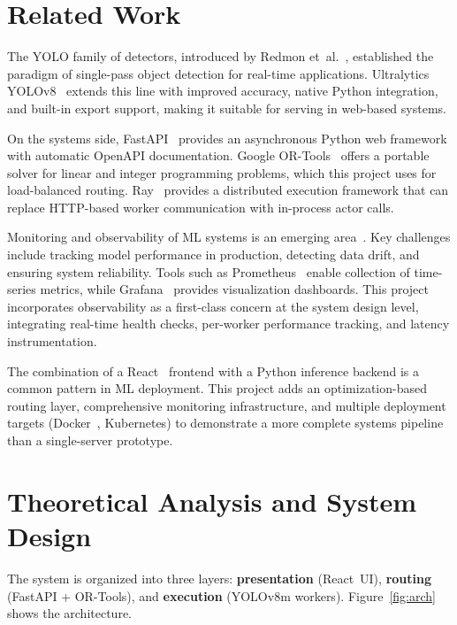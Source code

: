 \documentclass[12pt,a4paper]{report}
\begin{document}
\chapter{Related Work}
The YOLO family of detectors, introduced by Redmon et~al.~\cite{redmon2016yolo}, established the paradigm of single-pass object detection for real-time applications. Ultralytics YOLOv8~\cite{ultralytics} extends this line with improved accuracy, native Python integration, and built-in export support, making it suitable for serving in web-based systems.

On the systems side, FastAPI~\cite{fastapi} provides an asynchronous Python web framework with automatic OpenAPI documentation. Google OR-Tools~\cite{ortools} offers a portable solver for linear and integer programming problems, which this project uses for load-balanced routing. Ray~\cite{ray} provides a distributed execution framework that can replace HTTP-based worker communication with in-process actor calls.

Monitoring and observability of ML systems is an emerging area~\cite{sculley2015}. Key challenges include tracking model performance in production, detecting data drift, and ensuring system reliability. Tools such as Prometheus~\cite{prometheus} enable collection of time-series metrics, while Grafana~\cite{grafana} provides visualization dashboards. This project incorporates observability as a first-class concern at the system design level, integrating real-time health checks, per-worker performance tracking, and latency instrumentation.

The combination of a React~\cite{react} frontend with a Python inference backend is a common pattern in ML deployment. This project adds an optimization-based routing layer, comprehensive monitoring infrastructure, and multiple deployment targets (Docker~\cite{docker}, Kubernetes) to demonstrate a more complete systems pipeline than a single-server prototype.

\chapter{Theoretical Analysis and System Design}
The system is organized into three layers: \textbf{presentation} (React~UI), \textbf{routing} (FastAPI + OR-Tools), and \textbf{execution} (YOLOv8m workers). Figure~\ref{fig:arch} shows the architecture.
\end{document}

